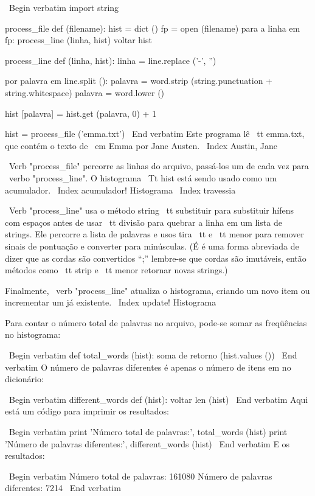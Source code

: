 \documentclass[10pt]{book}
\begin{document}
\begin {itemize}
{{{{{{{{{\ Begin {verbatim}
import string

process_file def (filename):
    hist = dict ()
    fp = open (filename)
    para a linha em fp:
        process_line (linha, hist)
    voltar hist

process_line def (linha, hist):
    linha = line.replace ('-', '')
    
    por palavra em line.split ():
        palavra = word.strip (string.punctuation + string.whitespace)
        palavra = word.lower ()

        hist [palavra] = hist.get (palavra, 0) + 1

hist = process_file ('emma.txt')
\ End {verbatim}
%
Este programa lê {\ tt emma.txt}, que contém o texto de {\ em
  Emma} por Jane Austen.
\ Index {Austin, Jane}

\ Verb "process_file" percorre as linhas do arquivo,
passá-los um de cada vez para \ verbo "process_line". O histograma
{\ Tt hist} está sendo usado como um acumulador.
\ Index {acumulador! Histograma}
\ Index {travessia}

\ Verb "process_line" usa o método string {\ tt substituir} para substituir
hífens com espaços antes de usar {\ tt divisão} para quebrar a linha em um
lista de strings. Ele percorre a lista de palavras e usos {tira \ tt}
e {\ tt menor} para remover sinais de pontuação e converter para minúsculas. (É
é uma forma abreviada de dizer que as cordas são convertidos ``;'' lembre-se que
cordas são imutáveis, então métodos como {\ tt strip} e {\ tt menor}
retornar novas strings.)

Finalmente, \ verb "process_line" atualiza o histograma, criando um novo
item ou incrementar um já existente.
\ Index {update! Histograma}

Para contar o número total de palavras no arquivo, pode-se somar
as freqüências no histograma:

\ Begin {verbatim}
def total_words (hist):
    soma de retorno (hist.values ​​())
\ End {verbatim}
%
O número de palavras diferentes é apenas o número de itens em
no dicionário:

\ Begin {verbatim}
different_words def (hist):
    voltar len (hist)
\ End {verbatim}
%
Aqui está um código para imprimir os resultados:

\ Begin {verbatim}
print 'Número total de palavras:', total_words (hist)
print 'Número de palavras diferentes:', different_words (hist)
\ End {verbatim}
%
E os resultados:

\ Begin {verbatim}
Número total de palavras: 161080
Número de palavras diferentes: 7214
\ End {verbatim}
%

}}}}}}}}}
\end{itemize}
\end{document}
